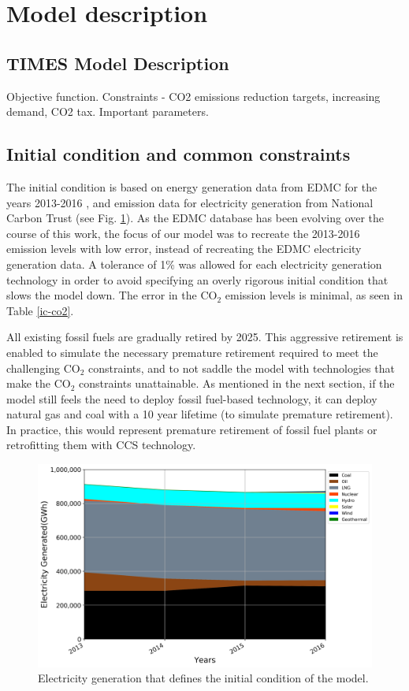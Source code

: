 \section{Model description} \label{Model-description}

\subsection{TIMES Model Description}
Objective function.
Constraints - CO2 emissions reduction targets, increasing demand, CO2 tax.
Important parameters.
\subsection{Initial condition and common constraints}
The initial condition is based on energy generation data from \gls{EDMC} for the years 2013-2016 , and emission data for electricity generation from National Carbon Trust (see Fig. \ref{ic-elc}). As the \gls{EDMC} database has been evolving over the course of this work, the focus of our model was to recreate the 2013-2016 emission levels with low error, instead of recreating the \gls{EDMC} electricity generation data. A tolerance of 1\% was allowed for each electricity generation technology in order to avoid specifying an overly rigorous initial condition that slows the model down. The error in the CO$_2$ emission levels is minimal, as seen in Table \ref{ic-co2}.

All existing fossil fuels are gradually retired by 2025. This aggressive retirement is enabled to simulate the necessary premature retirement required to meet the challenging CO$_2$ constraints, and to not saddle the model with technologies that make the CO$_2$ constraints unattainable. As mentioned in the next section, if the model still feels the need to deploy fossil fuel-based technology, it can deploy natural gas and coal with a 10 year lifetime (to simulate premature retirement). In practice, this would represent premature retirement of fossil fuel plants or retrofitting them with \gls{CCS} technology.

\begin{figure}[h] 
\centering
\label{ic-elc}
\includegraphics[scale=0.5]{figures/IC}
\caption{Electricity generation that defines the initial condition of the model.}
\end{figure}

